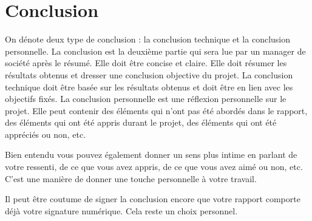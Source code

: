 \chapter{Conclusion}

On dénote deux type de conclusion : la conclusion technique et la conclusion personnelle. La conclusion est la deuxième partie qui sera lue par un manager de société après le résumé. Elle doit être concise et claire. Elle doit résumer les résultats obtenus et dresser une conclusion objective du projet. La conclusion technique doit être basée sur les résultats obtenus et doit être en lien avec les objectifs fixés. La conclusion personnelle est une réflexion personnelle sur le projet. Elle peut contenir des éléments qui n'ont pas été abordés dans le rapport, des éléments qui ont été appris durant le projet, des éléments qui ont été appréciés ou non, etc.

Bien entendu vous pouvez également donner un sens plus intime en parlant de votre ressenti, de ce que vous avez appris, de ce que vous avez aimé ou non, etc. C'est une manière de donner une touche personnelle à votre travail.

Il peut être coutume de signer la conclusion encore que votre rapport comporte déjà votre signature numérique. Cela reste un choix personnel.

\vfil
\hspace{8cm}\makeatletter\@author\makeatother\par
\hspace{8cm}\begin{minipage}{5cm}
    \printsignature
\end{minipage}